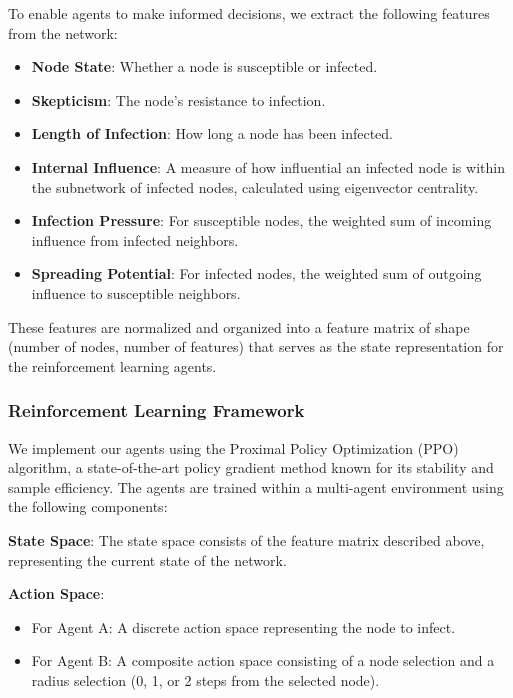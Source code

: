 \documentclass[12pt]{article}
\begin{document}
To enable agents to make informed decisions, we extract the following features from the network:

\begin{itemize}
    \item \textbf{Node State}: Whether a node is susceptible or infected.
    \item \textbf{Skepticism}: The node's resistance to infection.
    \item \textbf{Length of Infection}: How long a node has been infected.
    \item \textbf{Internal Influence}: A measure of how influential an infected node is within the subnetwork of infected nodes, calculated using eigenvector centrality.
    \item \textbf{Infection Pressure}: For susceptible nodes, the weighted sum of incoming influence from infected neighbors.
    \item \textbf{Spreading Potential}: For infected nodes, the weighted sum of outgoing influence to susceptible neighbors.
\end{itemize}

These features are normalized and organized into a feature matrix of shape (number of nodes, number of features) that serves as the state representation for the reinforcement learning agents.

\subsubsection{Reinforcement Learning Framework}

We implement our agents using the Proximal Policy Optimization (PPO) algorithm, a state-of-the-art policy gradient method known for its stability and sample efficiency. The agents are trained within a multi-agent environment using the following components:

\textbf{State Space}: The state space consists of the feature matrix described above, representing the current state of the network.

\textbf{Action Space}:
\begin{itemize}
    \item For Agent A: A discrete action space representing the node to infect.
    \item For Agent B: A composite action space consisting of a node selection and a radius selection (0, 1, or 2 steps from the selected node).
\end{itemize}
\end{document}
